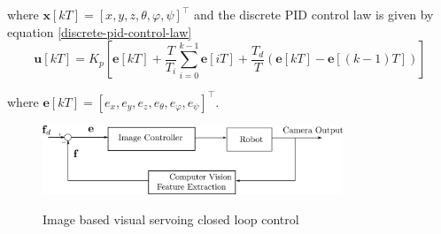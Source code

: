 where $\mathbf{x}[kT] = [x, y, z, θ, φ, ψ]^\top$ and the discrete PID control law is given by equation \ref{discrete-pid-control-law}
\begin{equation}
\label{discrete-pid-control-law}
\mathbf{u}[kT] = K_p \left[ \mathbf{e}[kT] + \frac{T}{T_i} \sum_{i=0}^{k-1} \mathbf{e}[iT] + \frac{T_d}{T} \left( \mathbf{e}[kT] - \mathbf{e}[(k-1)T] \right) \right]
\end{equation}

where $\mathbf{e}[kT] = [e_x, e_y, e_z, e_θ, e_φ, e_ψ]^\top$.

\begin{center}
\begin{figure}[H]
\centering
\includegraphics[width=0.8\textwidth]{images/visual-servoing-image-based.png}\\
\caption{Image based visual servoing closed loop control}
\label{visual-servoing-image-based-control}
\end{figure}
\end{center}
